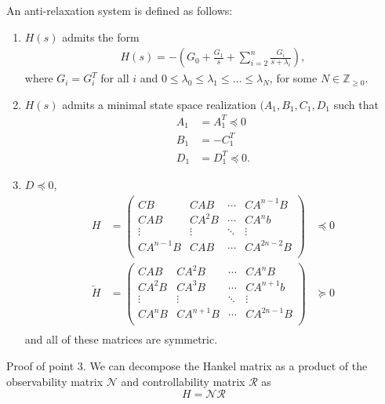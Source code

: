 An anti-relaxation system is defined as follows:
\begin{enumerate}
    \item $H(s)$ admits the form
    \begin{align*}
        H(s) = -(G_0 + \frac{G_1}{s} + \sum_{i = 2}^{n} \frac{G_i}{s + \lambda_i}),
    \end{align*}
    where $G_{i} = G_{i}^{T}$ for all $i$ and $ 0 \leq \lambda_0 \leq \lambda_1 \leq \ldots \leq \lambda_N$, for some $N \in \mathbb{Z}_{\geq0}$.
    \item $H(s)$ admits a minimal state space realization $(A_1, B_1, C_1, D_1$ such that
    \begin{align*}
        A_1 &= A_{1}^{T} \preceq 0 \\
        B_1 & = -C_1^{T} \\
        D_1 &= D_1^{T} \preceq 0.
    \end{align*}
    \item $D \preceq 0$,
    \begin{align*}
    H &=
        \begin{pmatrix}
            CB & CAB & \cdots & CA^{n-1}B\\
            CAB & CA^{2}B &\cdots & CA^{n}b \\
            \vdots & \vdots & \ddots & \vdots \\
            CA^{n-1}B & CAB & \cdots & CA^{2n-2}B \\
        \end{pmatrix} &\preceq 0 \\
      \overleftarrow{H} &=  \begin{pmatrix}
            CAB & CA^{2}B & \cdots & CA^{n}B\\
            CA^{2}B & CA^{3}B &\cdots & CA^{n+1}b \\
            \vdots & \vdots & \ddots & \vdots \\
            CA^{n}B & CA^{n+1}B & \cdots & CA^{2n-1}B \\
        \end{pmatrix} &\succeq 0 \\
    \end{align*}
    and all of these matrices are symmetric.
\end{enumerate}
Proof of point 3. We can decompose the Hankel matrix as a product of the observability matrix $\mathcal{N}$ and controllability matrix $\mathcal{R}$ as
\begin{equation}
    H = \mathcal{N}\mathcal{R}
\end{equation}
